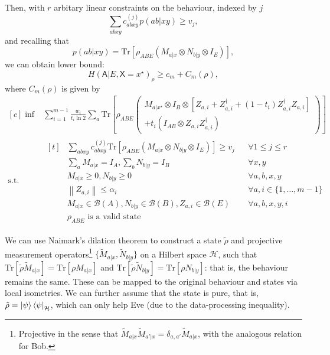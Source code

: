 \documentclass[10pt, a4paper]{article}
\numberwithin{equation}{section} %
\theoremstyle{definition}
\theoremstyle{plain}
\newcommand{\norm}[1]{\left\lVert#1\right\rVert}
\newcommand{\dintv}[2]{\mathopen\{#1,\ldots,#2\mathclose\}}
\newcommand{\?}{\mathrel{?}} %
\newcommand{\Tr}{\mathrm{Tr}} %
\newcommand{\Hs}{\mathcal{H}} %
\newcommand{\sB}{\mathcal{B}}
\newcommand{\crv}[1]{\mathsf{#1}}
\begin{document}
      Then, with \(r\) arbitary linear constraints on the behaviour, indexed by \(j\)
      \[ \sum_{abxy} c^{(j)}_{abxy} p(ab|xy) \geq v_j, \]
      and recalling that
      \[ p(ab|xy) = \Tr\left[\rho_{A B E} \left(M_{a|x} \otimes N_{b|y} \otimes I_{E}\right) \right], \]
      we can obtain lower bound:
      \begin{equation}
        H{(\crv{A}|E, \crv{X}=x^{\star})}_{\rho} \geq c_m + C_m(\rho),
      \end{equation}
      where \(C_m(\rho)\) is given by
      \begin{equation}
        \begin{aligned}[c]
          \inf & \sum_{i=1}^{m-1} \frac{w_i}{t_i \ln 2} \sum_a \Tr\left[ 
            \rho_{A B E} \left(
            \begin{gathered}
            M_{a|x^{\star}} \otimes I_{B} \otimes \left[ Z_{a,i} + Z_{a,i}^{\dagger} + (1-t_i)  Z_{a,i}^{\dagger}Z_{a,i} \right] \\
            + t_i \left( I_{A B} \otimes Z_{a,i}Z_{a,i}^{\dagger}\right) 
            \end{gathered}
            \right)
          \right] \\
          \text{s.t.} & \begin{aligned}[t] 
            & \sum_{abxy} c^{(j)}_{abxy} \Tr\left[\rho_{A B E} \left(M_{a|x} \otimes N_{b|y} \otimes I_{E}\right) \right] \geq v_j & & \forall 1 \leq j \leq r \\
            & \sum_{a} M_{a|x} = I_{A}, \sum_{b} N_{b|y} = I_{B} & & \forall x, y \\
            & M_{a|x} \geq 0, N_{b|y} \geq 0 & & \forall a, b, x, y \\
            & \norm{Z_{a,i}} \leq \alpha_i & & \forall a, i \in \dintv{1}{m-1} \\
            & M_{a|x} \in \sB(A), N_{b|y} \in \sB(B), Z_{a,i} \in \sB(E) & & \forall a, b, x, y, i \\
            & \rho_{A B E} \text{ is a valid state} & &
          \end{aligned}
        \end{aligned}
      \end{equation}

      We can use Naimark's dilation theorem to construct a state \(\tilde{\rho}\) and projective measurement operators\footnote{Projective in the sense that \(\tilde{M}_{a|x}\tilde{M}_{a'|x} = \delta_{a,a'}\tilde{M}_{a|x}\), with the analogous relation for Bob.} \(\{\tilde{M}_{a|x}, \tilde{N}_{b|y}\}\) on a Hilbert space \(\Hs\), such that \(\Tr\left[\tilde{\rho}\tilde{M}_{a|x}\right] = \Tr\left[\rho M_{a|x}\right]\) and  \(\Tr\left[\tilde{\rho}\tilde{N}_{b|y}\right] = \Tr\left[\rho N_{b|y}\right]\): that is, the behaviour remains the same. These can be mapped to the original behaviour and states via local isometries. We can further assume that the state is pure, that is, \(\tilde{\rho} = {\ket{\psi}\bra{\psi}}_{\Hs}\), which can only help Eve (due to the data-processing inequality).
\end{document}
